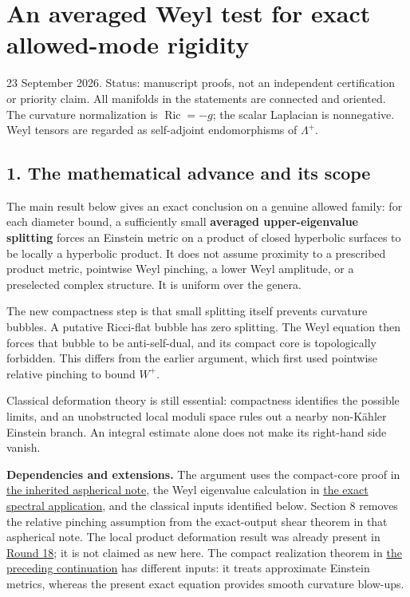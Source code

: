 \documentclass[
  11pt,
]{article}
\author{}
\date{}
\begin{document}
\hypertarget{an-averaged-weyl-test-for-exact-allowed-mode-rigidity}{%
\section{An averaged Weyl test for exact allowed-mode
rigidity}\label{an-averaged-weyl-test-for-exact-allowed-mode-rigidity}}

23 September 2026. Status: manuscript proofs, not an independent
certification or priority claim. All manifolds in the statements are
connected and oriented. The curvature normalization is
\(\operatorname{Ric}=-g\); the scalar Laplacian is nonnegative. Weyl
tensors are regarded as self-adjoint endomorphisms of \(\Lambda^+\).

\hypertarget{the-mathematical-advance-and-its-scope}{%
\subsection{1. The mathematical advance and its
scope}\label{the-mathematical-advance-and-its-scope}}

The main result below gives an exact conclusion on a genuine allowed
family: for each diameter bound, a sufficiently small \textbf{averaged
upper-eigenvalue splitting} forces an Einstein metric on a product of
closed hyperbolic surfaces to be locally a hyperbolic product. It does
not assume proximity to a prescribed product metric, pointwise Weyl
pinching, a lower Weyl amplitude, or a preselected complex structure. It
is uniform over the genera.

The new compactness step is that small splitting itself prevents
curvature bubbles. A putative Ricci-flat bubble has zero splitting. The
Weyl equation then forces that bubble to be anti-self-dual, and its
compact core is topologically forbidden. This differs from the earlier
argument, which first used pointwise relative pinching to bound \(W^+\).

Classical deformation theory is still essential: compactness identifies
the possible limits, and an unobstructed local moduli space rules out a
nearby non-Kähler Einstein branch. An integral estimate alone does not
make its right-hand side vanish.

\textbf{Dependencies and extensions.} The argument uses the compact-core
proof in
\href{../mathematics/current/line1_aspherical_no_bubbles.md}{the
inherited aspherical note}, the Weyl eigenvalue calculation in
\href{../mathematics/current/line1_einstein_spectral_application.md}{the
exact spectral application}, and the classical inputs identified below.
Section 8 removes the relative pinching assumption from the exact-output
shear theorem in that aspherical note. The local product deformation
result was already present in
\href{../mathematics/current/round18_twisted_operator.md}{Round 18}; it
is not claimed as new here. The compact realization theorem in
\href{20260923_compact_realization.md}{the preceding continuation} has
different inputs: it treats approximate Einstein metrics, whereas the
present exact equation provides smooth curvature blow-ups.
\end{document}
